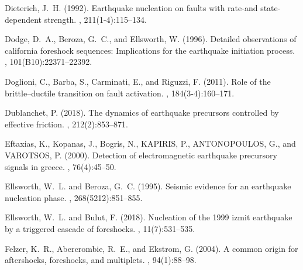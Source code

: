 \documentclass[a4paper,12pt,twoside]{article}
\begin{document}
\begin{thebibliography}{}
Dieterich, J.~H. (1992).
\newblock Earthquake nucleation on faults with rate-and state-dependent
  strength.
, 211(1-4):115--134.

Dodge, D.~A., Beroza, G.~C., and Ellsworth, W. (1996).
\newblock Detailed observations of california foreshock sequences: Implications
  for the earthquake initiation process.
,
  101(B10):22371--22392.

Doglioni, C., Barba, S., Carminati, E., and Riguzzi, F. (2011).
\newblock Role of the brittle--ductile transition on fault activation.
,
  184(3-4):160--171.

Dublanchet, P. (2018).
\newblock The dynamics of earthquake precursors controlled by effective
  friction.
, 212(2):853--871.
  
Eftaxias, K., Kopanas, J., Bogris, N., KAPIRIS, P., ANTONOPOULOS, G., and
  VAROTSOS, P. (2000).
\newblock Detection of electromagnetic earthquake precursory signals in greece.
, 76(4):45--50.

Ellsworth, W.~L. and Beroza, G.~C. (1995).
\newblock Seismic evidence for an earthquake nucleation phase.
, 268(5212):851--855.

Ellsworth, W.~L. and Bulut, F. (2018).
\newblock Nucleation of the 1999 izmit earthquake by a triggered cascade of
  foreshocks.
, 11(7):531--535.

\protect{}

Felzer, K.~R., Abercrombie, R.~E., and Ekstrom, G. (2004).
\newblock A common origin for aftershocks, foreshocks, and multiplets.
, 94(1):88--98.


\end{thebibliography}
\end{document}
